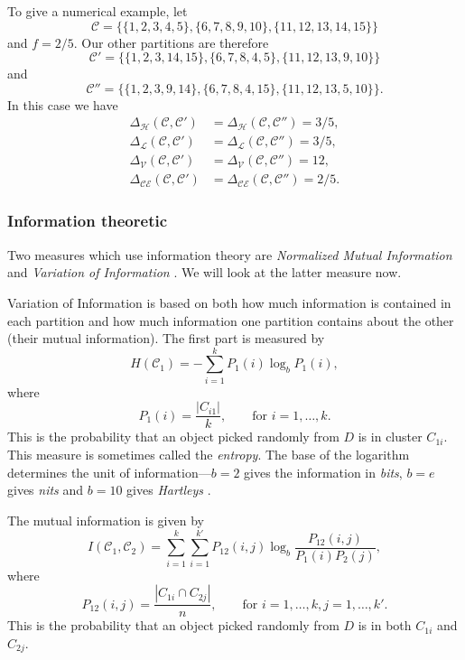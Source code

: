 \documentclass[a4paper]{report}
\newcommand{\dset}{D}
\newcommand{\clus}{\mathcal{C}}
\newcommand{\partcomparep}[1]{\Delta_{\mathcal{#1}}(\clus,\clus')}
\newcommand{\partcomparepp}[1]{\Delta_{\mathcal{#1}}(\clus,\clus'')}
\begin{document}
To give a numerical example, let
\begin{equation*}
  \clus = \{\{1,2,3,4,5\},\{6,7,8,9,10\},\{11,12,13,14,15\}\}
\end{equation*}
and $f = 2/5$.  Our other partitions are therefore
\begin{equation*}
\clus' = \{\{1,2,3,14,15\},\{6,7,8,4,5\},\{11,12,13,9,10\}\}
\end{equation*}
and
\begin{equation*}
\clus'' = \{\{1,2,3,9,14\},\{6,7,8,4,15\},\{11,12,13,5,10\}\}.
\end{equation*}
In this case we have
\begin{align*}
  \partcomparep{H} &= \partcomparepp{H} = 3/5,\\
  \partcomparep{L} &= \partcomparepp{L} = 3/5,\\
  \partcomparep{V} &= \partcomparepp{V} = 12,\\
  \partcomparep{CE} &= \partcomparepp{CE} = 2/5.
\end{align*}


\subsubsection{Information theoretic}
\label{sec:inform-theor}

Two measures which use information theory are \textit{Normalized Mutual
  Information} \citep{fred-jain-2003} and \textit{Variation of Information}
\citep{meila-2007}.  We will look at the latter measure now.

Variation of Information is based on both how much information is contained in
each partition and how much information one partition contains about the other
(their mutual information).  The first part is measured by
\begin{equation*}
  H(\clus_1) = -\sum_{i=1}^{k} P_1(i) \log_b P_1(i),
\end{equation*}
where
\begin{equation*}
  P_1(i) = \frac{|C_{i1}|}{k}, \qquad \text{for $i = 1,\dotsc,k$}.
\end{equation*}
This is the probability that an object picked randomly from $\dset$ is in
cluster $C_{1i}$.  This measure is sometimes called the \textit{entropy}.  The
base of the logarithm determines the unit of information---$b=2$ gives the
information in \textit{bits}, $b=e$ gives \textit{nits} and $b=10$ gives
\textit{Hartleys} \citep{kullback68information}.

The mutual information is given by
\begin{equation*}
  I(\clus_1,\clus_2) = \sum_{i=1}^{k} \sum_{i=1}^{k'}
                      P_{12}(i,j) \log_b \frac{P_{12}(i,j)}{P_1(i)P_2(j)},
\end{equation*}
where
\begin{equation*}
  P_{12}(i,j) = \frac{|C_{1i} \cap C_{2j}|}{n}, \qquad \text{for $i =
    1,\dotsc,k,j = 1,\dotsc,k'$}.
\end{equation*}
This is the probability that an object picked randomly from $\dset$ is in
both $C_{1i}$ and $C_{2j}$.
\end{document}
